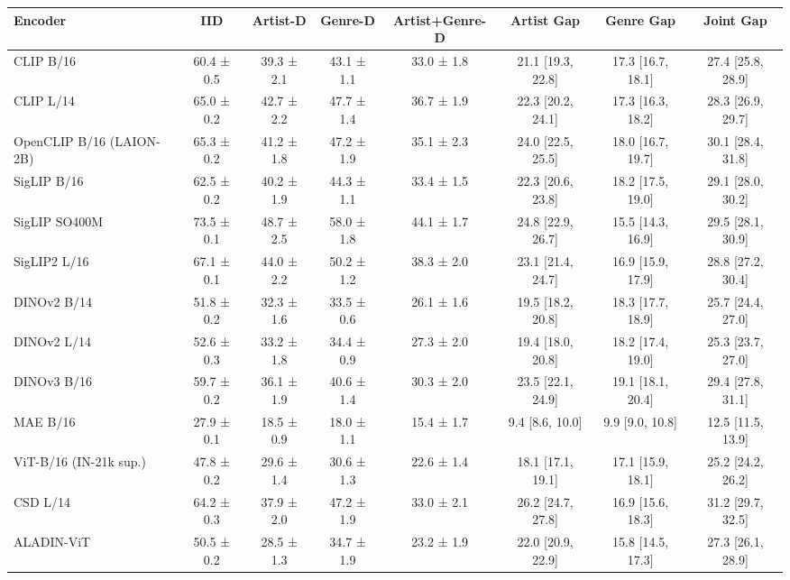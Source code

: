 \begin{tabular}{lccccccc}
\toprule
Encoder & IID & Artist-D & Genre-D & Artist+Genre-D & Artist Gap & Genre Gap & Joint Gap \\
\midrule
CLIP B/16 & 60.4 ± 0.5 & 39.3 ± 2.1 & 43.1 ± 1.1 & 33.0 ± 1.8 & 21.1 [19.3, 22.8] & 17.3 [16.7, 18.1] & 27.4 [25.8, 28.9] \\
CLIP L/14 & 65.0 ± 0.2 & 42.7 ± 2.2 & 47.7 ± 1.4 & 36.7 ± 1.9 & 22.3 [20.2, 24.1] & 17.3 [16.3, 18.2] & 28.3 [26.9, 29.7] \\
OpenCLIP B/16 (LAION-2B) & 65.3 ± 0.2 & 41.2 ± 1.8 & 47.2 ± 1.9 & 35.1 ± 2.3 & 24.0 [22.5, 25.5] & 18.0 [16.7, 19.7] & 30.1 [28.4, 31.8] \\
SigLIP B/16 & 62.5 ± 0.2 & 40.2 ± 1.9 & 44.3 ± 1.1 & 33.4 ± 1.5 & 22.3 [20.6, 23.8] & 18.2 [17.5, 19.0] & 29.1 [28.0, 30.2] \\
SigLIP SO400M & 73.5 ± 0.1 & 48.7 ± 2.5 & 58.0 ± 1.8 & 44.1 ± 1.7 & 24.8 [22.9, 26.7] & 15.5 [14.3, 16.9] & 29.5 [28.1, 30.9] \\
SigLIP2 L/16 & 67.1 ± 0.1 & 44.0 ± 2.2 & 50.2 ± 1.2 & 38.3 ± 2.0 & 23.1 [21.4, 24.7] & 16.9 [15.9, 17.9] & 28.8 [27.2, 30.4] \\
DINOv2 B/14 & 51.8 ± 0.2 & 32.3 ± 1.6 & 33.5 ± 0.6 & 26.1 ± 1.6 & 19.5 [18.2, 20.8] & 18.3 [17.7, 18.9] & 25.7 [24.4, 27.0] \\
DINOv2 L/14 & 52.6 ± 0.3 & 33.2 ± 1.8 & 34.4 ± 0.9 & 27.3 ± 2.0 & 19.4 [18.0, 20.8] & 18.2 [17.4, 19.0] & 25.3 [23.7, 27.0] \\
DINOv3 B/16 & 59.7 ± 0.2 & 36.1 ± 1.9 & 40.6 ± 1.4 & 30.3 ± 2.0 & 23.5 [22.1, 24.9] & 19.1 [18.1, 20.4] & 29.4 [27.8, 31.1] \\
MAE B/16 & 27.9 ± 0.1 & 18.5 ± 0.9 & 18.0 ± 1.1 & 15.4 ± 1.7 & 9.4 [8.6, 10.0] & 9.9 [9.0, 10.8] & 12.5 [11.5, 13.9] \\
ViT-B/16 (IN-21k sup.) & 47.8 ± 0.2 & 29.6 ± 1.4 & 30.6 ± 1.3 & 22.6 ± 1.4 & 18.1 [17.1, 19.1] & 17.1 [15.9, 18.1] & 25.2 [24.2, 26.2] \\
CSD L/14 & 64.2 ± 0.3 & 37.9 ± 2.0 & 47.2 ± 1.9 & 33.0 ± 2.1 & 26.2 [24.7, 27.8] & 16.9 [15.6, 18.3] & 31.2 [29.7, 32.5] \\
ALADIN-ViT & 50.5 ± 0.2 & 28.5 ± 1.3 & 34.7 ± 1.9 & 23.2 ± 1.9 & 22.0 [20.9, 22.9] & 15.8 [14.5, 17.3] & 27.3 [26.1, 28.9] \\
\bottomrule
\end{tabular}
